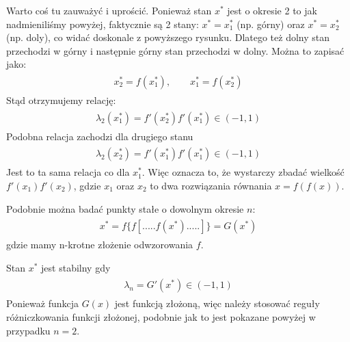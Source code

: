 \documentclass[a4paper,12pt,polish]{sphinxmanual}
\begin{document}
Warto coś tu zauważyć  i uprościć. Ponieważ stan $x^*$ jest o okresie 2 to jak nadmieniliśmy powyżej, faktycznie są 2 stany: $x^* = x^*_1$ (np. górny)  oraz $x^* = x^*_2$ (np. doly), co widać doskonale z powyższego rysunku. Dlatego też dolny stan przechodzi w górny i następnie górny stan przechodzi w dolny. Można to zapisać jako:
\label{ch1/chI031:equation-eqn37}\begin{gather}
\begin{split}x_2^* = f(x_1^*), \qquad x_1^* = f(x_2^*)\end{split}\label{ch1/chI031-eqn37}
\end{gather}
Stąd otrzymujemy relację:
\label{ch1/chI031:equation-eqn38}\begin{gather}
\begin{split}  \lambda_2(x_1^*)  = f'(x^*_2) f'(x^*_1) \in (-1, 1)\end{split}\label{ch1/chI031-eqn38}
\end{gather}
Podobna relacja zachodzi dla drugiego stanu
\label{ch1/chI031:equation-eqn39}\begin{gather}
\begin{split}  \lambda_2(x_2^*)  = f'(x^*_1) f'(x^*_1) \in (-1, 1)\end{split}\label{ch1/chI031-eqn39}
\end{gather}
Jest to ta sama relacja co dla $x^*_1$. Więc oznacza to, że wystarczy zbadać wielkość $f'(x_1)f'(x_2)$, gdzie $x_1$  oraz  $x_2$ to dwa  rozwiązania równania $x=f(f(x))$.

Podobnie można badać  punkty stałe o dowolnym okresie $n$:
\label{ch1/chI031:equation-eqn40}\begin{gather}
\begin{split}x^*= f\{f[ .....f(x^*) .....]\}  = G(x^*)\end{split}\label{ch1/chI031-eqn40}
\end{gather}
gdzie mamy n-krotne złożenie odwzorowania $f$.

Stan  $x^*$  jest  stabilny gdy
\label{ch1/chI031:equation-eqn41}\begin{gather}
\begin{split}\lambda_n = G'(x^*) \in (-1, 1)\end{split}\label{ch1/chI031-eqn41}
\end{gather}
Ponieważ funkcja $G(x)$ jest funkcją złożoną, więc  należy stosować reguły różniczkowania  funkcji złożonej, podobnie jak to jest pokazane powyżej w przypadku $n=2$.
\end{document}
